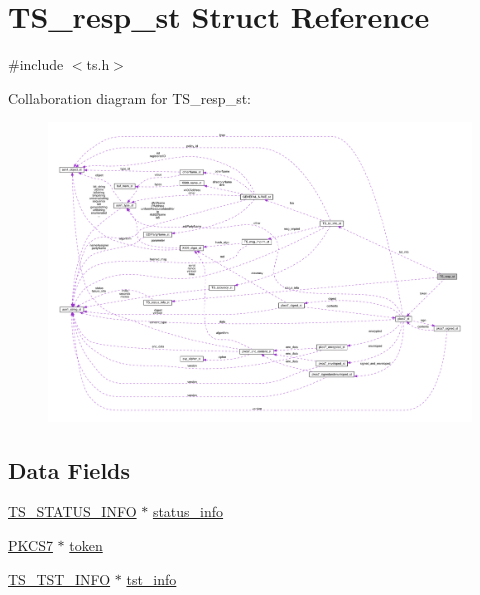 \hypertarget{struct_t_s__resp__st}{}\section{T\+S\+\_\+resp\+\_\+st Struct Reference}
\label{struct_t_s__resp__st}


{\ttfamily \#include $<$ts.\+h$>$}



Collaboration diagram for T\+S\+\_\+resp\+\_\+st\+:\nopagebreak
\begin{figure}[H]
\begin{center}
\leavevmode
\includegraphics[width=350pt]{struct_t_s__resp__st__coll__graph}
\end{center}
\end{figure}
\subsection*{Data Fields}
\begin{DoxyCompactItemize}
\item 
\hyperlink{crypto_2ts_2ts_8h_a6f09f73975393a634d74cd34e9072c73}{T\+S\+\_\+\+S\+T\+A\+T\+U\+S\+\_\+\+I\+N\+FO} $\ast$ \hyperlink{struct_t_s__resp__st_a658c4c7389e6ce0a1b7ac5c8dbc5f2c0}{status\+\_\+info}
\item 
\hyperlink{crypto_2pkcs7_2pkcs7_8h_af773f722a43f0fee6be7bfc1721c5290}{P\+K\+C\+S7} $\ast$ \hyperlink{struct_t_s__resp__st_ad39eecc4084bb685b12436d310e2b128}{token}
\item 
\hyperlink{crypto_2ts_2ts_8h_a7de94faeeabec73a2241426a20ffa24f}{T\+S\+\_\+\+T\+S\+T\+\_\+\+I\+N\+FO} $\ast$ \hyperlink{struct_t_s__resp__st_aaca0fcdfa8c33f023dab39596693bef0}{tst\+\_\+info}
\end{DoxyCompactItemize}


